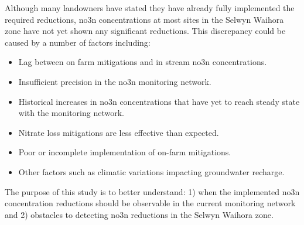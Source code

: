Although many landowners have stated they have already fully implemented the required reductions\citep{scottpc}, \gls{no3n} concentrations at most sites in the Selwyn Waihora zone have not yet shown any significant reductions\citep{scottpc}.
This discrepancy could be caused by a number of factors including:
\begin{itemize}
    \item Lag between on farm mitigations and in stream \gls{no3n} concentrations.
    \item Insufficient precision in the \gls{no3n} monitoring network.
    \item Historical increases in \gls{no3n} concentrations that have yet to reach steady state with the monitoring network.
    \item Nitrate loss mitigations are less effective than expected.
    \item Poor or incomplete implementation of on-farm mitigations.
    \item Other factors such as climatic variations impacting groundwater recharge.
\end{itemize}
The purpose of this study is to better understand: 1) when the implemented \gls{no3n} concentration reductions should be observable in the current monitoring network and 2) obstacles to detecting \gls{no3n} reductions in the Selwyn Waihora zone.
